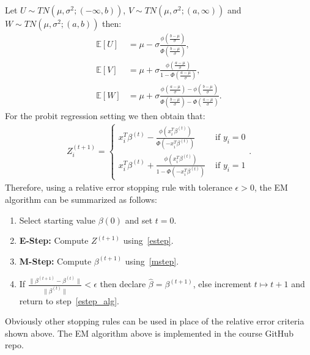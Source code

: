 \documentclass[11pt]{article}
\begin{document}
Let $U\sim{}TN(\mu,\sigma^{2};(-\infty,b))$, $V\sim{}TN(\mu,\sigma^{2};(a,\infty))$ and $W\sim{}TN(\mu,\sigma^{2};(a,b))$ then: 
\begin{align*}
\mathbb{E}\left[U\right] &= \mu -  \sigma\frac{\phi(\frac{b-\mu}{\sigma})}{\Phi(\frac{b-\mu}{\sigma})} ,  \\
\mathbb{E}\left[V\right] &= \mu +  \sigma\frac{\phi(\frac{a-\mu}{\sigma})}{1 - \Phi(\frac{a-\mu}{\sigma})} ,  \\
\mathbb{E}\left[W\right] &= \mu +  \sigma\frac{\phi(\frac{a-\mu}{\sigma})-\phi(\frac{b-\mu}{\sigma})}{\Phi(\frac{b-\mu}{\sigma})-\Phi(\frac{a-\mu}{\sigma})} .
\end{align*}
For the probit regression setting we then obtain that:
\begin{align}
\label{estep}
Z_{i}^{(t+1)} = \left\{ 
\begin{array}{cl}
 x_{i}^{T}\beta^{(t)} - \frac{\phi(x_{i}^{T}\beta^{(t)})}{\Phi(-x_{i}^{T}\beta^{(t)})} & \textrm{ if } y_{i}=0 \\
 x_{i}^{T}\beta^{(t)} + \frac{\phi(x_{i}^{T}\beta^{(t)})}{1-\Phi\left(-x_{i}^{T}\beta^{(t)}\right)} & \textrm{ if } y_{i}=1 
\end{array}
\right. .
\end{align}
Therefore, using a relative error stopping rule with tolerance $\epsilon>0$, the EM algorithm can be summarized as follows:
\begin{enumerate}
\item Select starting value $\beta{(0)}$ and set $t=0$. 
\item\label{estep_alg} \textbf{E-Step:} Compute $Z^{(t+1)}$ using~\eqref{estep}.
\item \textbf{M-Step:} Compute $\beta^{(t+1)}$ using~\eqref{mstep}.
\item If $\frac{\|\beta^{(t+1)}-\beta^{(t)}\|}{\|\beta^{(t)}\|} < \epsilon$ then declare $\hat{\beta}=\beta^{(t+1)}$,
else increment $t\mapsto{}t+1$ and return to step~\ref{estep_alg}.
\end{enumerate}
Obviously other stopping rules can be used in place of the relative error criteria shown above. The EM algorithm above is
implemented in the course GitHub repo.
\end{document}
